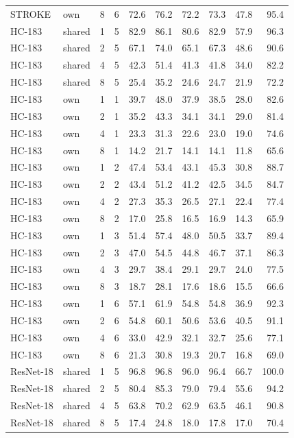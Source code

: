 \documentclass[10pt,a4paper]{article}
\begin{document}
\begin{longtable}{llrrrrrrrr}
STROKE & own & 8 & 6 & 72.6 & 76.2 & 72.2 & 73.3 & 47.8 & 95.4 \\
HC-183 & shared & 1 & 5 & 82.9 & 86.1 & 80.6 & 82.9 & 57.9 & 96.3 \\
HC-183 & shared & 2 & 5 & 67.1 & 74.0 & 65.1 & 67.3 & 48.6 & 90.6 \\
HC-183 & shared & 4 & 5 & 42.3 & 51.4 & 41.3 & 41.8 & 34.0 & 82.2 \\
HC-183 & shared & 8 & 5 & 25.4 & 35.2 & 24.6 & 24.7 & 21.9 & 72.2 \\
HC-183 & own & 1 & 1 & 39.7 & 48.0 & 37.9 & 38.5 & 28.0 & 82.6 \\
HC-183 & own & 2 & 1 & 35.2 & 43.3 & 34.1 & 34.1 & 29.0 & 81.4 \\
HC-183 & own & 4 & 1 & 23.3 & 31.3 & 22.6 & 23.0 & 19.0 & 74.6 \\
HC-183 & own & 8 & 1 & 14.2 & 21.7 & 14.1 & 14.1 & 11.8 & 65.6 \\
HC-183 & own & 1 & 2 & 47.4 & 53.4 & 43.1 & 45.3 & 30.8 & 88.7 \\
HC-183 & own & 2 & 2 & 43.4 & 51.2 & 41.2 & 42.5 & 34.5 & 84.7 \\
HC-183 & own & 4 & 2 & 27.3 & 35.3 & 26.5 & 27.1 & 22.4 & 77.4 \\
HC-183 & own & 8 & 2 & 17.0 & 25.8 & 16.5 & 16.9 & 14.3 & 65.9 \\
HC-183 & own & 1 & 3 & 51.4 & 57.4 & 48.0 & 50.5 & 33.7 & 89.4 \\
HC-183 & own & 2 & 3 & 47.0 & 54.5 & 44.8 & 46.7 & 37.1 & 86.3 \\
HC-183 & own & 4 & 3 & 29.7 & 38.4 & 29.1 & 29.7 & 24.0 & 77.5 \\
HC-183 & own & 8 & 3 & 18.7 & 28.1 & 17.6 & 18.6 & 15.5 & 66.6 \\
HC-183 & own & 1 & 6 & 57.1 & 61.9 & 54.8 & 54.8 & 36.9 & 92.3 \\
HC-183 & own & 2 & 6 & 54.8 & 60.1 & 50.6 & 53.6 & 40.5 & 91.1 \\
HC-183 & own & 4 & 6 & 33.0 & 42.9 & 32.1 & 32.7 & 25.6 & 77.1 \\
HC-183 & own & 8 & 6 & 21.3 & 30.8 & 19.3 & 20.7 & 16.8 & 69.0 \\
ResNet-18 & shared & 1 & 5 & 96.8 & 96.8 & 96.0 & 96.4 & 66.7 & 100.0 \\
ResNet-18 & shared & 2 & 5 & 80.4 & 85.3 & 79.0 & 79.4 & 55.6 & 94.2 \\
ResNet-18 & shared & 4 & 5 & 63.8 & 70.2 & 62.9 & 63.5 & 46.1 & 90.8 \\
ResNet-18 & shared & 8 & 5 & 17.4 & 24.8 & 18.0 & 17.8 & 17.0 & 70.4 \\

\end{longtable}
\end{document}
